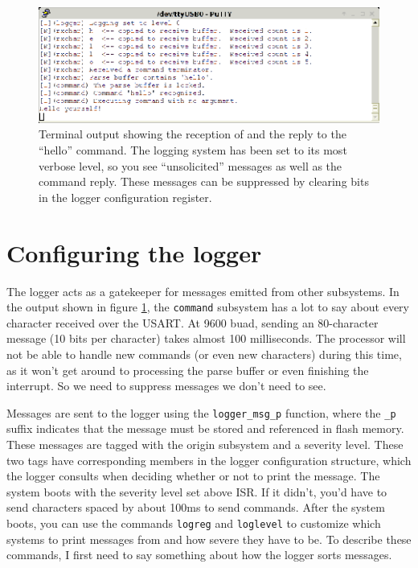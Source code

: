 \begin{figure}[ht]
    \begin{center}
        \includegraphics[clip,scale=2]{pngs/hellotrace.eps}
        \caption{Terminal output showing the reception of and the reply to the ``hello'' command.  The logging system has been set to its most verbose level, so you see ``unsolicited'' messages as well as the command reply.  These messages can be suppressed by clearing bits in the logger configuration register.\label{fig:hellotrace}}
    \end{center}
\end{figure}

\clearpage{}
\section{Configuring the logger}
The logger acts as a gatekeeper for messages emitted from other subsystems.  In the output shown in figure \ref{fig:hellotrace}, the \texttt{command} subsystem has a lot to say about every character received over the USART.  At 9600 buad, sending an 80-character message (10 bits per character) takes almost 100 milliseconds.  The processor will not be able to handle new commands (or even new characters) during this time, as it won't get around to processing the parse buffer or even finishing the interrupt.  So we need to suppress messages we don't need to see.  

Messages are sent to the logger using the \texttt{logger\_msg\_p} function, where the \texttt{\_p} suffix indicates that the message must be stored and referenced in flash memory.  These messages are tagged with the origin subsystem and a severity level.  These two tags have corresponding members in the logger configuration structure, which the logger consults when deciding whether or not to print the message.  The system boots with the severity level set above ISR.  If it didn't, you'd have to send characters spaced by about 100ms to send commands.  After the system boots, you can use the commands \texttt{logreg} and \texttt{loglevel} to customize which systems to print messages from and how severe they have to be.  To describe these commands, I first need to say something about how the logger sorts messages.

